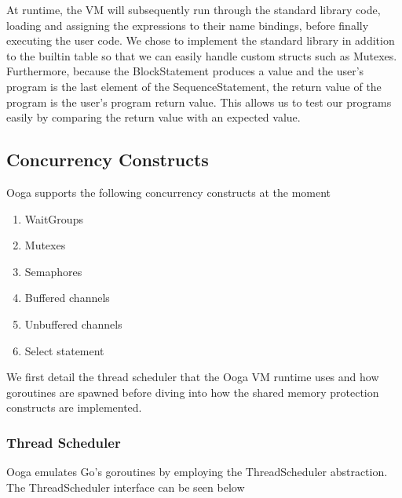 \documentclass{report}
\begin{document}
At runtime, the VM will subsequently run through the standard library code, loading and assigning the expressions to their name bindings, before finally executing the user code. We chose to implement the standard library in addition to the builtin table so that we can easily handle custom structs such as Mutexes. Furthermore, because the BlockStatement produces a value and the user's program is the last element of the SequenceStatement, the return value of the program is the user's program return value. This allows us to test our programs easily by comparing the return value with an expected value.

\subsection{Concurrency Constructs}\label{section:concurrency}

Ooga supports the following concurrency constructs at the moment

\begin{enumerate}
    \item WaitGroups
    \item Mutexes
    \item Semaphores
    \item Buffered channels
    \item Unbuffered channels
    \item Select statement
\end{enumerate}

We first detail the thread scheduler that the Ooga VM runtime uses and how goroutines are spawned before diving into how the shared memory protection constructs are implemented.

\subsubsection{Thread Scheduler}

Ooga emulates Go's goroutines by employing the ThreadScheduler abstraction. The ThreadScheduler interface can be seen below
\end{document}
